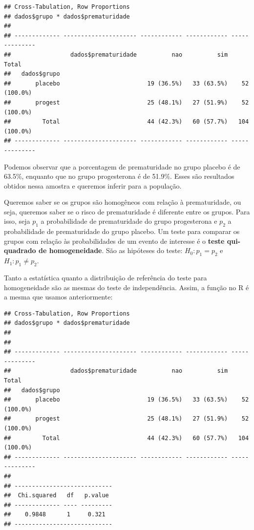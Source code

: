 \documentclass[
]{book}
\newenvironment{Shaded}{\begin{snugshade}}{\end{snugshade}}
\newcommand{\CommentTok}[1]{\textcolor[rgb]{0.56,0.35,0.01}{\textit{#1}}}
\newcommand{\DataTypeTok}[1]{\textcolor[rgb]{0.13,0.29,0.53}{#1}}
\newcommand{\KeywordTok}[1]{\textcolor[rgb]{0.13,0.29,0.53}{\textbf{#1}}}
\newcommand{\NormalTok}[1]{#1}
\newcommand{\OperatorTok}[1]{\textcolor[rgb]{0.81,0.36,0.00}{\textbf{#1}}}
\newcommand{\OtherTok}[1]{\textcolor[rgb]{0.56,0.35,0.01}{#1}}
\newcommand{\StringTok}[1]{\textcolor[rgb]{0.31,0.60,0.02}{#1}}
\begin{document}
\begin{verbatim}
## Cross-Tabulation, Row Proportions  
## dados$grupo * dados$prematuridade  
## 
## ------------- --------------------- ------------ ------------ --------------
##                 dados$prematuridade          nao          sim          Total
##   dados$grupo                                                               
##       placebo                         19 (36.5%)   33 (63.5%)    52 (100.0%)
##       progest                         25 (48.1%)   27 (51.9%)    52 (100.0%)
##         Total                         44 (42.3%)   60 (57.7%)   104 (100.0%)
## ------------- --------------------- ------------ ------------ --------------
\end{verbatim}

Podemos observar que a porcentagem de prematuridade no grupo placebo é de 63.5\%, enquanto que no grupo progesterona é de 51.9\%. Esses são resultados obtidos nessa amostra e queremos inferir para a população.

Queremos saber se os grupos são homogêneos com relação à prematuridade, ou seja, queremos saber se o risco de prematuridade é diferente entre os grupos. Para isso, seja \(p_1\) a probabilidade de prematuridade do grupo progesterona e \(p_2\) a probabilidade de prematuridade do grupo placebo. Um teste para comparar os grupos com relação às probabilidades de um evento de interesse é o \textbf{teste qui-quadrado de homogeneidade}. São as hipóteses do teste: \(H_0: p_1=p_2\) e \(H_1: p_1\neq p_2\).

Tanto a estatística quanto a distribuição de referência do teste para homogeneidade são as mesmas do teste de independência. Assim, a função no R é a mesma que usamos anteriormente:

\begin{Shaded}
\end{Shaded}

\begin{verbatim}
## Cross-Tabulation, Row Proportions  
## dados$grupo * dados$prematuridade  
## 
## 
## ------------- --------------------- ------------ ------------ --------------
##                 dados$prematuridade          nao          sim          Total
##   dados$grupo                                                               
##       placebo                         19 (36.5%)   33 (63.5%)    52 (100.0%)
##       progest                         25 (48.1%)   27 (51.9%)    52 (100.0%)
##         Total                         44 (42.3%)   60 (57.7%)   104 (100.0%)
## ------------- --------------------- ------------ ------------ --------------
## 
## ----------------------------
##  Chi.squared   df   p.value 
## ------------- ---- ---------
##    0.9848      1     0.321  
## ----------------------------
\end{verbatim}
\end{document}
